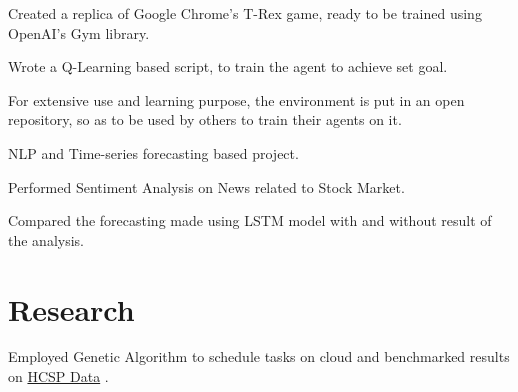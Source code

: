 \documentclass[]{deedy-resume-openfont}
\begin{document}
\begin{minipage}[t]{0.55\textwidth}
\begin{tightemize}
\item Created a replica of Google Chrome's T-Rex game, ready to be trained using OpenAI's Gym library.
\item Wrote a Q-Learning based script, to train the agent to achieve set goal.
\item For extensive use and learning purpose, the environment is put in an open repository, so as to be used by others to train their agents on it.
\end{tightemize}
\sectionsep

\vspace{\topsep} %
\begin{tightemize}
\item NLP and Time-series forecasting based project.
\item Performed Sentiment Analysis on News related to Stock Market.
\item Compared the forecasting made using LSTM model with and without result of the analysis.
\end{tightemize}
\sectionsep

\section{Research}
\begin{tightemize}
\item Employed Genetic Algorithm to schedule tasks on cloud and benchmarked results on \href{https://www.fing.edu.uy/inco/grupos/cecal/hpc/HCSP/index.htm}{HCSP Data} .
\end{tightemize}
\sectionsep

\end{minipage} 
\end{document}
